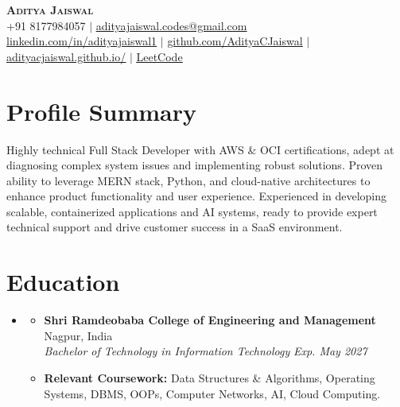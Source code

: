 \documentclass[letterpaper,11pt]{article}
\newcommand{\resumeItem}[1]{
  \item\small{
    {#1 \vspace{-2pt}}
  }
}
\newcommand{\resumeSubheading}[4]{
  \vspace{-1pt}\item
    \begin{itemize}[leftmargin=0in, label={}]
      \item
      \textbf{#1} \hfill #2 \\
      \textit{\small#3} \hfill \textit{\small #4} \\
    \end{itemize}\vspace{-6pt}
}
\newcommand{\resumeSubHeadingListStart}{\begin{itemize}[leftmargin=0.15in, label={}, itemsep=-1pt]}
\newcommand{\resumeSubHeadingListEnd}{\end{itemize}}
\newcommand{\resumeItemListStart}{\begin{itemize}[itemsep=0pt]}
\newcommand{\resumeItemListEnd}{\end{itemize}\vspace{-5pt}}
\begin{document}
\begin{center}
    \textbf{\Huge \scshape Aditya Jaiswal} \\ \vspace{2pt}
    \small +91 8177984057 $|$ \href{mailto:adityajaiswal.codes@gmail.com}{\underline{adityajaiswal.codes@gmail.com}} \\ \vspace{2pt}
    \href{https://www.linkedin.com/in/adityajaiswal1/}{\underline{linkedin.com/in/adityajaiswal1}} $|$
    \href{https://github.com/AdityaCJaiswal}{\underline{github.com/AdityaCJaiswal}} $|$
    \href{https://adityacjaiswal.github.io/}{\underline{adityacjaiswal.github.io/}} $|$
    \href{https://leetcode.com/u/Adityacjaiswal/}{\underline{LeetCode}}
\end{center}


\section{Profile Summary}
 \resumeSubHeadingListStart
   \small{\item{
     Highly technical Full Stack Developer with AWS \& OCI certifications, adept at diagnosing complex system issues and implementing robust solutions. Proven ability to leverage MERN stack, Python, and cloud-native architectures to enhance product functionality and user experience. Experienced in developing scalable, containerized applications and AI systems, ready to provide expert technical support and drive customer success in a SaaS environment.
   }}
 \resumeSubHeadingListEnd


\section{Education}
  \resumeSubHeadingListStart
    \resumeSubheading
      {Shri Ramdeobaba College of Engineering and Management}{Nagpur, India}
      {Bachelor of Technology in Information Technology}{Exp. May 2027}
      \resumeItemListStart
        \resumeItem{\textbf{Relevant Coursework:} Data Structures \& Algorithms, Operating Systems, DBMS, OOPs, Computer Networks, AI, Cloud Computing.}
      \resumeItemListEnd
  \resumeSubHeadingListEnd


\end{document}
